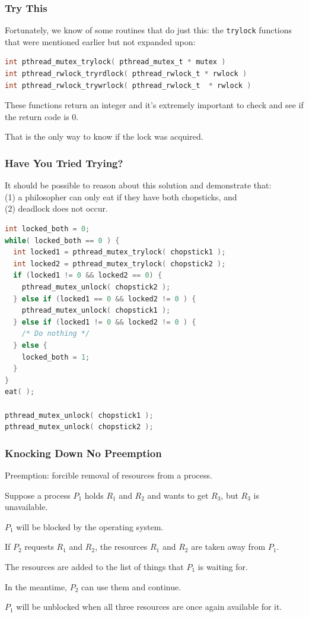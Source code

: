 \begin{frame}[fragile]
\frametitle{Try This}
Fortunately, we know of some routines that do just this: the \texttt{trylock} functions that were mentioned earlier but not expanded upon:
\begin{lstlisting}[language=C]
int pthread_mutex_trylock( pthread_mutex_t * mutex )
int pthread_rwlock_tryrdlock( pthread_rwlock_t * rwlock )
int pthread_rwlock_trywrlock( pthread_rwlock_t  * rwlock )
\end{lstlisting}

These functions return an integer and it's extremely important to check and see if the return code is 0. 

That is the only way to know if the lock was acquired.

\end{frame}


\begin{frame}[fragile]
\frametitle{Have You Tried Trying?}

It should be possible to reason about this solution and demonstrate that:\\
\quad (1) a philosopher can only eat if they have both chopsticks, and\\
\quad (2) deadlock does not occur.

\begin{lstlisting}[language=C]
int locked_both = 0;
while( locked_both == 0 ) {
  int locked1 = pthread_mutex_trylock( chopstick1 );
  int locked2 = pthread_mutex_trylock( chopstick2 );
  if (locked1 != 0 && locked2 == 0) {
    pthread_mutex_unlock( chopstick2 );
  } else if (locked1 == 0 && locked2 != 0 ) {
    pthread_mutex_unlock( chopstick1 );
  } else if (locked1 != 0 && locked2 != 0 ) {
    /* Do nothing */
  } else {
    locked_both = 1;
  }
}
eat( );

pthread_mutex_unlock( chopstick1 );
pthread_mutex_unlock( chopstick2 );
\end{lstlisting}

\end{frame}



\begin{frame}
\frametitle{Knocking Down No Preemption}

Preemption: forcible removal of resources from a process.

Suppose a process $P_{1}$ holds $R_{1}$ and $R_{2}$ and wants to get $R_{3}$, but $R_{3}$ is unavailable. 

$P_{1}$ will be blocked by the operating system. 

If $P_{2}$ requests $R_{1}$ and $R_{2}$, the resources $R_{1}$ and $R_{2}$ are taken away from $P_{1}$.

The resources are added to the list of things that $P_{1}$ is waiting for.

In the meantime, $P_{2}$ can use them and continue. 

$P_{1}$ will be unblocked when all three resources are once again available for it.

\end{frame}


